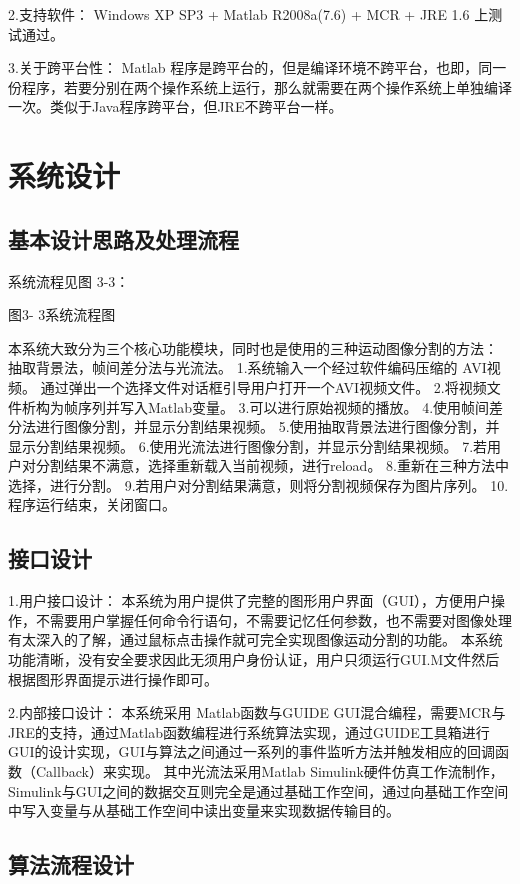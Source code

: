 \documentclass[18pt, twoside, a4paper, dvipdfm]{book}
\begin{document}
2.支持软件：
	Windows XP SP3 + Matlab R2008a(7.6) + MCR + JRE 1.6 上测试通过。

3.关于跨平台性：
	Matlab 程序是跨平台的，但是编译环境不跨平台，也即，同一份程序，若要分别在两个操作系统上运行，那么就需要在两个操作系统上单独编译一次。类似于Java程序跨平台，但JRE不跨平台一样。

\section{系统设计}
\subsection{基本设计思路及处理流程}
系统流程见图 3-3：

 

图3- 3系统流程图

	本系统大致分为三个核心功能模块，同时也是使用的三种运动图像分割的方法：
抽取背景法，帧间差分法与光流法。
1.系统输入一个经过软件编码压缩的 AVI视频。
通过弹出一个选择文件对话框引导用户打开一个AVI视频文件。
2.将视频文件析构为帧序列并写入Matlab变量。
3.可以进行原始视频的播放。
4.使用帧间差分法进行图像分割，并显示分割结果视频。
5.使用抽取背景法进行图像分割，并显示分割结果视频。
6.使用光流法进行图像分割，并显示分割结果视频。
7.若用户对分割结果不满意，选择重新载入当前视频，进行reload。
8.重新在三种方法中选择，进行分割。
9.若用户对分割结果满意，则将分割视频保存为图片序列。
10.程序运行结束，关闭窗口。

\subsection{接口设计}

1.用户接口设计：
本系统为用户提供了完整的图形用户界面（GUI），方便用户操作，不需要用户掌握任何命令行语句，不需要记忆任何参数，也不需要对图像处理有太深入的了解，通过鼠标点击操作就可完全实现图像运动分割的功能。
	本系统功能清晰，没有安全要求因此无须用户身份认证，用户只须运行GUI.M文件然后根据图形界面提示进行操作即可。

2.内部接口设计：
	本系统采用 Matlab函数与GUIDE GUI混合编程，需要MCR与JRE的支持，通过Matlab函数编程进行系统算法实现，通过GUIDE工具箱进行GUI的设计实现，GUI与算法之间通过一系列的事件监听方法并触发相应的回调函数（Callback）来实现。
	其中光流法采用Matlab Simulink硬件仿真工作流制作，Simulink与GUI之间的数据交互则完全是通过基础工作空间，通过向基础工作空间中写入变量与从基础工作空间中读出变量来实现数据传输目的。

\subsection{算法流程设计}
\end{document}
